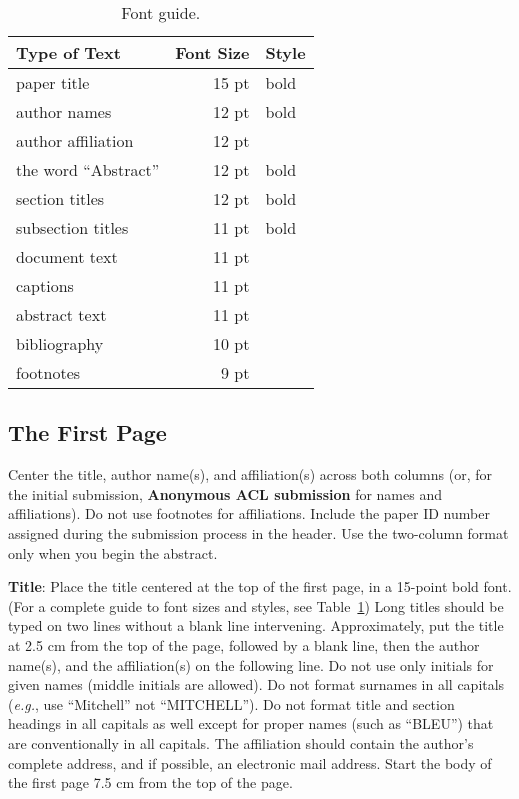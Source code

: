\documentclass[11pt,a4paper]{article}
\begin{document}
\begin{table}[t!]
\begin{center}
\begin{tabular}{|l|rl|}
\hline \bf Type of Text & \bf Font Size & \bf Style \\ \hline
paper title & 15 pt & bold \\
author names & 12 pt & bold \\
author affiliation & 12 pt & \\
the word ``Abstract'' & 12 pt & bold \\
section titles & 12 pt & bold \\
subsection titles & 11 pt & bold \\
document text & 11 pt  &\\
captions & 11 pt & \\
abstract text & 11 pt & \\
bibliography & 10 pt & \\
footnotes & 9 pt & \\
\hline
\end{tabular}
\end{center}
\caption{\label{font-table} Font guide. }
\end{table}

\subsection{The First Page}
\label{ssec:first}

Center the title, author name(s), and affiliation(s) across both
columns (or, for the initial submission, \textbf{Anonymous ACL submission} for names and affiliations). Do not use footnotes for affiliations.
Include the paper ID number assigned during the submission process in the header.
Use the two-column format only when you begin the abstract.

\textbf{Title}: Place the title centered at the top of the first page, in
a 15-point bold font. (For a complete guide to font sizes and styles,
see Table~\ref{font-table}) Long titles should be typed on two lines
without a blank line intervening. Approximately, put the title at 2.5
cm from the top of the page, followed by a blank line, then the
author name(s), and the affiliation(s) on the following line. Do not
use only initials for given names (middle initials are allowed). Do
not format surnames in all capitals ({\em e.g.}, use ``Mitchell'' not
``MITCHELL'').  Do not format title and section headings in all
capitals as well except for proper names (such as ``BLEU'') that are
conventionally in all capitals.  The affiliation should contain the
author's complete address, and if possible, an electronic mail
address. Start the body of the first page 7.5 cm from the top of the
page.
\end{document}
